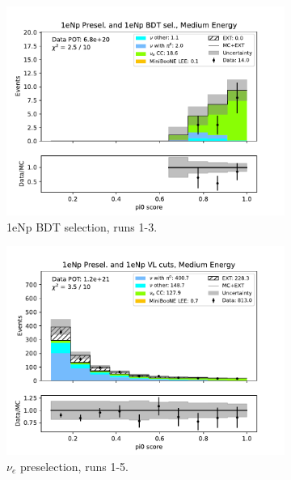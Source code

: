 \begin{figure}[H]
\begin{subfigure}{0.33\linewidth}
        \includegraphics[width=\linewidth]{technote/Sidebands/Figures/NearSideband/near_sideband_pi0_score_run123_NP_NPBDT_MEDIUM_ENERGY.pdf}
        \caption{1eNp BDT selection, runs 1-3.}
    \end{subfigure}
    \begin{subfigure}{0.33\linewidth}
        \includegraphics[width=\linewidth]{technote/Sidebands/Figures/NearSideband/near_sideband_pi0_score_run1234a4b4c4d5_NP_NP_MEDIUM_ENERGY.pdf}
        \caption{$\nu_e$ preselection, runs 1-5.}
    \end{subfigure}%
    \begin{subfigure}{0.33\linewidth}

\end{subfigure}
\end{figure}
